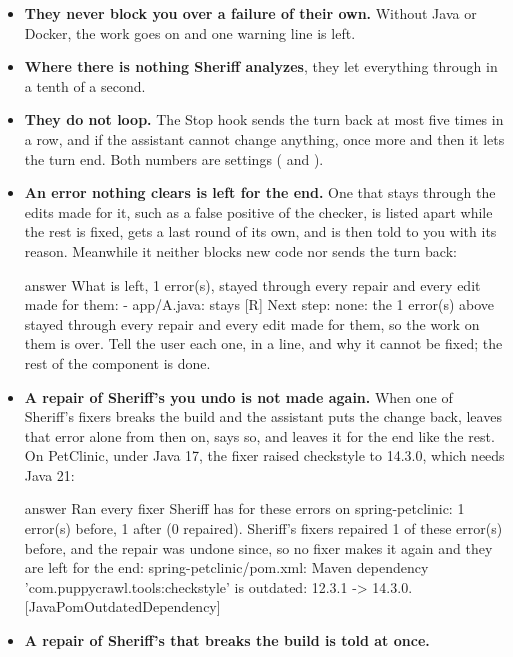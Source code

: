 \documentclass[11pt,a4paper]{article}
\begin{document}
\begin{itemize}
  \item \textbf{They never block you over a failure of their own.} Without Java
        or Docker, the work goes on and one warning line is left.
  \item \textbf{Where there is nothing Sheriff analyzes}, they let everything
        through in a tenth of a second.
  \item \textbf{They do not loop.} The Stop hook sends the turn back at most
        five times in a row, and if the assistant cannot change anything, once
        more and then it lets the turn end. Both numbers are settings
        ( and ).
  \item \textbf{An error nothing clears is left for the end.} One that stays
        through the edits made for it, such as a false positive of the
        checker, is listed apart while the rest is fixed, gets a last round of
        its own, and is then told to you with its reason. Meanwhile it neither
        blocks new code nor sends the turn back:
\begin{command}[basicstyle=\ttfamily\footnotesize]{answer}
What is left, 1 error(s), stayed through every repair and every edit made
for them:
  - app/A.java: stays  [R]
Next step: none: the 1 error(s) above stayed through every repair and every
edit made for them, so the work on them is over. Tell the user each one, in a
line, and why it cannot be fixed; the rest of the component is done.
\end{command}
  \item \textbf{A repair of Sheriff's you undo is not made again.} When one of
        Sheriff's fixers breaks the build and the assistant puts the change
        back,  leaves that error alone from then on, says so,
        and leaves it for the end like the rest. On PetClinic, under Java 17,
        the fixer raised checkstyle to 14.3.0, which needs Java 21:
\begin{command}[basicstyle=\ttfamily\footnotesize]{answer}
Ran every fixer Sheriff has for these errors on spring-petclinic: 1 error(s)
before, 1 after (0 repaired).
Sheriff's fixers repaired 1 of these error(s) before, and the repair was undone
since, so no fixer makes it again and they are left for the end:
spring-petclinic/pom.xml: Maven dependency 'com.puppycrawl.tools:checkstyle' is
outdated: 12.3.1 -> 14.3.0. [JavaPomOutdatedDependency]
\end{command}
  \item \textbf{A repair of Sheriff's that breaks the build is told at once.}

\end{itemize}
\end{document}

